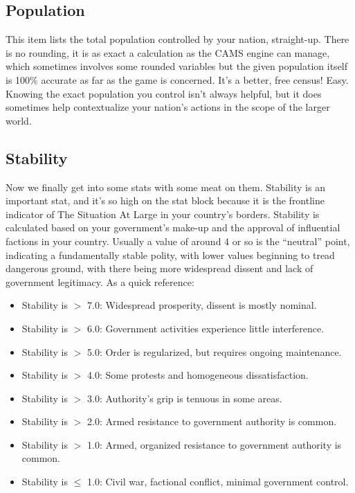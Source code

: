 \documentclass[11 pt]{scrartcl}
\begin{document}
\subsection{Population}

This item lists the total population controlled by your nation, straight-up. There is no rounding, it is as exact a calculation as the CAMS engine can manage, which sometimes involves some rounded variables but the given population itself is 100\% accurate as far as the game is concerned. It's a better, free census! Easy. Knowing the exact population you control isn't always helpful, but it does sometimes help contextualize your nation's actions in the scope of the larger world.

\subsection{Stability}

Now we finally get into some stats with some meat on them. Stability is an important stat, and it's so high on the stat block because it is the frontline indicator of The Situation At Large in your country's borders. Stability is calculated based on your government's make-up and the approval of influential factions in your country. Usually a value of around 4 or so is the ``neutral'' point, indicating a fundamentally stable polity, with lower values beginning to tread dangerous ground, with there being more widespread dissent and lack of government legitimacy. As a quick reference:

\begin{itemize}
\item Stability is $>$ 7.0: Widespread prosperity, dissent is mostly nominal.
\item Stability is $>$ 6.0: Government activities experience little interference.
\item Stability is $>$ 5.0: Order is regularized, but requires ongoing maintenance.
\item Stability is $>$ 4.0: Some protests and homogeneous dissatisfaction.
\item Stability is $>$ 3.0: Authority's grip is tenuous in some areas.
\item Stability is $>$ 2.0: Armed resistance to government authority is common.
\item Stability is $>$ 1.0: Armed, organized resistance to government authority is common.
\item Stability is $\leq$ 1.0: Civil war, factional conflict, minimal government control.
\end{itemize}
\end{document}
